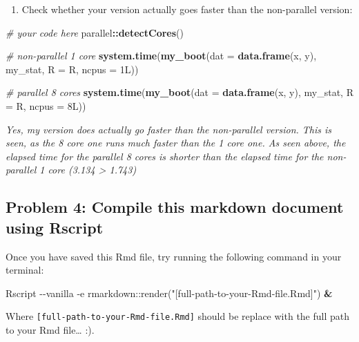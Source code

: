 \documentclass[
]{article}
\newenvironment{Shaded}{\begin{snugshade}}{\end{snugshade}}
\newcommand{\AttributeTok}[1]{\textcolor[rgb]{0.13,0.29,0.53}{#1}}
\newcommand{\CommentTok}[1]{\textcolor[rgb]{0.56,0.35,0.01}{\textit{#1}}}
\newcommand{\DataTypeTok}[1]{\textcolor[rgb]{0.13,0.29,0.53}{#1}}
\newcommand{\DecValTok}[1]{\textcolor[rgb]{0.00,0.00,0.81}{#1}}
\newcommand{\ExtensionTok}[1]{#1}
\newcommand{\FunctionTok}[1]{\textcolor[rgb]{0.13,0.29,0.53}{\textbf{#1}}}
\newcommand{\KeywordTok}[1]{\textcolor[rgb]{0.13,0.29,0.53}{\textbf{#1}}}
\newcommand{\NormalTok}[1]{#1}
\newcommand{\SpecialCharTok}[1]{\textcolor[rgb]{0.81,0.36,0.00}{\textbf{#1}}}
\newcommand{\StringTok}[1]{\textcolor[rgb]{0.31,0.60,0.02}{#1}}
\providecommand{\tightlist}{%
  \setlength{\itemsep}{0pt}\setlength{\parskip}{0pt}}
\begin{document}
\begin{enumerate}
\def\labelenumi{\arabic{enumi}.}
\setcounter{enumi}{1}
\tightlist
\item
  Check whether your version actually goes faster than the non-parallel
  version:
\end{enumerate}

\begin{Shaded}
\begin{Highlighting}[]
\CommentTok{\# your code here}
\NormalTok{parallel}\SpecialCharTok{::}\FunctionTok{detectCores}\NormalTok{()}

\CommentTok{\# non{-}parallel 1 core}
\FunctionTok{system.time}\NormalTok{(}\FunctionTok{my\_boot}\NormalTok{(}\AttributeTok{dat =} \FunctionTok{data.frame}\NormalTok{(x, y), my\_stat, }\AttributeTok{R =}\NormalTok{ R, }\AttributeTok{ncpus =} \DecValTok{1}\DataTypeTok{L}\NormalTok{))}


\CommentTok{\# parallel 8 cores}
\FunctionTok{system.time}\NormalTok{(}\FunctionTok{my\_boot}\NormalTok{(}\AttributeTok{dat =} \FunctionTok{data.frame}\NormalTok{(x, y), my\_stat, }\AttributeTok{R =}\NormalTok{ R, }\AttributeTok{ncpus =} \DecValTok{8}\DataTypeTok{L}\NormalTok{))}
\end{Highlighting}
\end{Shaded}

\emph{Yes, my version does actually go faster than the non-parallel
version. This is seen, as the 8 core one runs much faster than the 1
core one. As seen above, the elapsed time for the parallel 8 cores is
shorter than the elapsed time for the non-parallel 1 core (3.134
\textgreater{} 1.743)}

\subsection{Problem 4: Compile this markdown document using
Rscript}\label{problem-4-compile-this-markdown-document-using-rscript}

Once you have saved this Rmd file, try running the following command in
your terminal:

\begin{Shaded}
\begin{Highlighting}[]
\ExtensionTok{Rscript} \AttributeTok{{-}{-}vanilla} \AttributeTok{{-}e} \StringTok{\textquotesingle{}rmarkdown::render("[full{-}path{-}to{-}your{-}Rmd{-}file.Rmd]")\textquotesingle{}} \KeywordTok{\&}
\end{Highlighting}
\end{Shaded}

Where \texttt{{[}full-path-to-your-Rmd-file.Rmd{]}} should be replace
with the full path to your Rmd file\ldots{} :).
\end{document}
